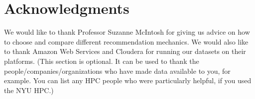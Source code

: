 \documentclass[letterpaper,twocolumn,10pt]{article}
\begin{document}
%
%
%
%
%
%
%
%

\section{Acknowledgments}
We would like to thank Professor Suzanne McIntosh for giving us advice on how to choose  and compare different recommendation mechanics. We would also like to thank Amazon Web Services and Cloudera for running our datasets on their platforms.
(This section is optional. It can be used to thank the  people/companies/organizations who have made data available to you, for example. You can list any HPC people who were particularly helpful, if you used the NYU HPC.)


 
 
\end{document}
